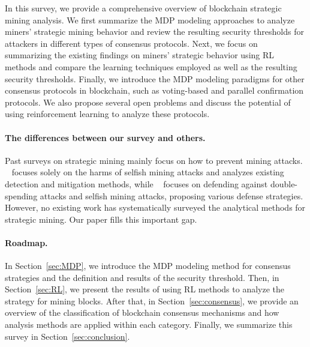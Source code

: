 In this survey, we provide a comprehensive overview of blockchain strategic mining analysis.  
We first summarize the MDP modeling approaches to analyze miners' strategic mining behavior and review the resulting security thresholds for attackers in different types of consensus protocols.  
Next, we focus on summarizing the existing findings on miners' strategic behavior using RL methods and compare the learning techniques employed as well as the resulting security thresholds.  
Finally, we introduce the MDP modeling paradigms for other consensus protocols in blockchain, such as voting-based and parallel confirmation protocols. 
We also propose several open problems and discuss the potential of using reinforcement learning to analyze these protocols.

\paragraph{The differences between our survey and others.}
Past surveys on strategic mining mainly focus on how to prevent mining attacks.
~\cite{madhushanie2024selfish} focuses solely on the harms of selfish mining attacks and analyzes existing detection and mitigation methods,
while ~\cite{nicolas2020blockchain} focuses on defending against double-spending attacks and selfish mining attacks, proposing various defense strategies.
However, no existing work has systematically surveyed the analytical methods for strategic mining. 
Our paper fills this important gap.

\paragraph{Roadmap.}
In Section~\ref{sec:MDP}, we introduce the MDP modeling method for consensus strategies and the definition and results of the security threshold.  
Then, in Section~\ref{sec:RL}, we present the results of using RL methods to analyze the strategy for mining blocks.  
After that, in Section~\ref{sec:consensus}, we provide an overview of the classification of blockchain consensus mechanisms and how analysis methods are applied within each category. 
Finally, we summarize this survey in Section~\ref{sec:conclusion}.  